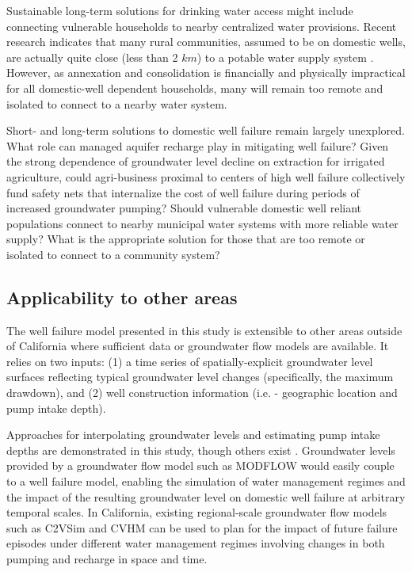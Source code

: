 Sustainable long-term solutions for drinking water access might include connecting vulnerable households to nearby centralized water provisions. Recent research indicates that many rural communities, assumed to be on domestic wells, are actually quite close (less than 2 $km$) to a potable water supply system \citep{London2018}. However, as annexation and consolidation is financially and physically impractical for all domestic-well dependent households, many will remain too remote and isolated to connect to a nearby water system.  

Short- and long-term solutions to domestic well failure remain largely unexplored. What role can managed aquifer recharge play in mitigating well failure? Given the strong dependence of groundwater level decline on extraction for irrigated agriculture, could agri-business proximal to centers of high well failure collectively fund safety nets that internalize the cost of well failure during periods of increased groundwater pumping? Should vulnerable domestic well reliant populations connect to nearby municipal water systems with more reliable water supply? What is the appropriate solution for those that are too remote or isolated to connect to a community system? 

\subsection{Applicability to other areas}

The well failure model presented in this study is extensible to other areas outside of California where sufficient data or groundwater flow models are available. It relies on two inputs: (1) a time series of spatially-explicit groundwater level surfaces reflecting typical groundwater level changes (specifically, the maximum drawdown), and (2) well construction information (i.e. - geographic location and pump intake depth). 

Approaches for interpolating groundwater levels and estimating pump intake depths are demonstrated in this study, though others exist \citep{Gailey2019, Perrone2017, OSullivan2010, JournelA.G.Huijbregts1978}. Groundwater levels provided by a groundwater flow model such as MODFLOW \citep{Harbaugh2000} would easily couple to a well failure model, enabling the simulation of water management regimes and the impact of the resulting groundwater level on domestic well failure at arbitrary temporal scales. In California, existing regional-scale groundwater flow models such as C2VSim \citep{Brush2013} and CVHM \citep{Faunted.2009} can be used to plan for the impact of future failure episodes under different water management regimes involving changes in both pumping and recharge in space and time. 


